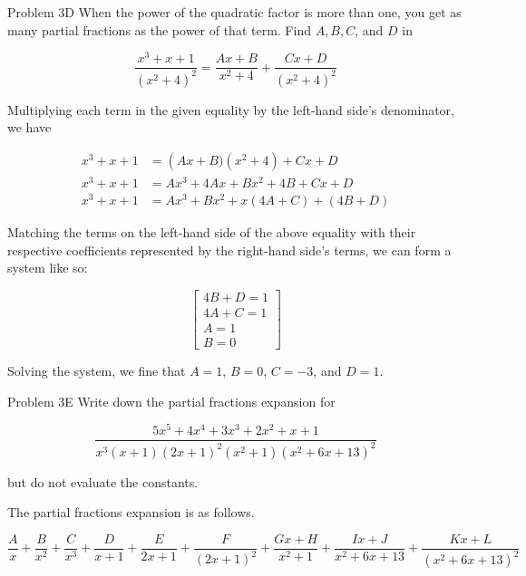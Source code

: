 \documentclass{article}
\begin{document}
    \begin{tbhtheorem}{Problem 3D}
        When the power of the quadratic factor is more than one, you get as many partial fractions as the power of that term. Find $A,B,C$, and $D$ in

        \[
            \frac{x^3+x+1}{\left(x^2+4\right)^2} = \frac{Ax+B}{x^2+4} + \frac{Cx+D}{\left(x^2+4\right)^2}
        \]
    \end{tbhtheorem}

    Multiplying each term in the given equality by the left-hand side's denominator, we have

    \begin{align*}
        x^3 + x + 1 &= \left(Ax+B)\left(x^2+4\right) + Cx+D \\
        x^3 + x + 1 &= Ax^3 + 4Ax + Bx^2 + 4B + Cx + D \\
        x^3 + x + 1 &= Ax^3 + Bx^2 + x\left(4A + C\right) + \left(4B + D\right)
    \end{align*}

    \pagebreak
    \thispagestyle{6}

    Matching the terms on the left-hand side of the above equality with their respective coefficients represented by the right-hand side's terms, we can form a system like so:

    \[
        \begin{bmatrix}
            4B + D = 1 \\
            4A + C = 1 \\
            A = 1 \\
            B = 0
        \end{bmatrix}
    \]

    Solving the system, we fine that $A=1$, $B=0$, $C=-3$, and $D=1$.


    \begin{tbhtheorem}{Problem 3E}
        Write down the partial fractions expansion for

        \[
            \frac{5x^5 + 4x^4 + 3x^3 + 2x^2 + x + 1}{x^3(x+1)(2x+1)^2(x^2+1)(x^2+6x+13)^2}
        \]

        but do not evaluate the constants.
    \end{tbhtheorem}

    The partial fractions expansion is as follows.

    \[
        \frac{A}{x} + \frac{B}{x^2} + \frac{C}{x^3} + \frac{D}{x+1} + \frac{E}{2x+1} + \frac{F}{\left(2x+1\right)^2} + \frac{Gx+H}{x^2+1} + \frac{Ix+J}{x^2+6x+13} + \frac{Kx+L}{(x^2+6x+13)^2}
    \]
\end{document}
